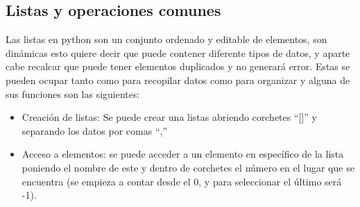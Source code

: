 \subsection{Listas y operaciones comunes}
Las listas en python son un conjunto ordenado y editable de elementos, son dinámicas esto quiere decir que puede contener diferente tipos de datos, y aparte cabe recalcar que puede tener elementos duplicados y no generará error. Estas se pueden ocupar tanto como para recopilar datos como para organizar y alguna de sus funciones son las siguientes:

\begin{itemize}
    \item Creación de listas: Se puede crear una listas abriendo corchetes ``[]'' y separando los datos por comas ``,''
    \begin{figure}[h]
        \centering
      \end{figure}
    
    \item Acceso a elementos: se puede acceder a un elemento en específico de la lista poniendo el nombre de este y dentro de corchetes el número en el lugar que se encuentra  (se empieza a contar desde el 0, y para seleccionar el último será -1).
    \begin{figure}[h]
        \centering
      \end{figure}
    

\end{itemize}
